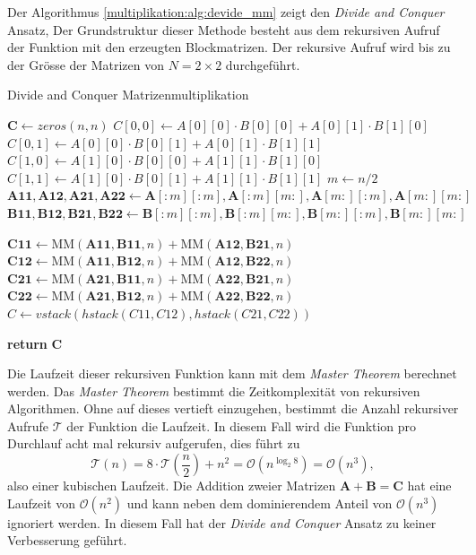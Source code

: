 Der Algorithmus \ref{multiplikation:alg:devide_mm} zeigt den \textit{Divide and Conquer} Ansatz,
Der Grundstruktur dieser Methode besteht aus dem rekursiven Aufruf der Funktion mit den erzeugten Blockmatrizen.
Der rekursive Aufruf wird bis zu der Gr\"osse der Matrizen von $N = 2 \times 2$ durchgef\"uhrt.
\begin{algorithm}\footnotesize\caption{Divide and Conquer Matrizenmultiplikation}
	\setlength{\lineskip}{7pt}
	\label{multiplikation:alg:devide_mm}
	\begin{algorithmic}
		\State  $ \mathbf{C} \gets zeros(n, n)$
		\State  $C[0, 0] \gets  A[0][0]\cdot B[0][0]+A[0][1]\cdot B[1][0]$
		\State  $C[0, 1] \gets  A[0][0]\cdot B[0][1]+A[0][1]\cdot B[1][1]$
		\State  $C[1, 0] \gets  A[1][0]\cdot B[0][0]+A[1][1]\cdot B[1][0]$
		\State  $C[1, 1] \gets  A[1][0]\cdot B[0][1]+A[1][1]\cdot B[1][1]$
		\Else
		\State  $ m \gets n/2$
		\State $\mathbf{A11}, \mathbf{A12}, \mathbf{A21}, \mathbf{A22} \gets \mathbf{A}[:m][:m], \mathbf{A}[:m][m:], \mathbf{A}[m:][:m], \mathbf{A}[m:][m:]$
		\State $\mathbf{B11}, \mathbf{B12}, \mathbf{B21}, \mathbf{B22} \gets \mathbf{B}[:m][:m], \mathbf{B}[:m][m:], \mathbf{B}[m:][:m], \mathbf{B}[m:][m:]$

		\State $\mathbf{C11} \gets \text{MM}(\mathbf{A11}, \mathbf{B11},n) + \text{MM}(\mathbf{A12}, \mathbf{B21},n)$
		\State $\mathbf{C12} \gets \text{MM}(\mathbf{A11},\mathbf{B12},n) + \text{MM}(\mathbf{A12}, \mathbf{B22},n)$
		\State $\mathbf{C21} \gets \text{MM}(\mathbf{A21}, \mathbf{B11},n) + \text{MM}(\mathbf{A22}, \mathbf{B21},n)$
		\State $\mathbf{C22} \gets \text{MM}(\mathbf{A21}, \mathbf{B12},n) + \text{MM}(\mathbf{A22}, \mathbf{B22},n)$
		\State $  C \gets vstack(hstack(C11, C12), hstack(C21, C22))$

		\EndIf
		\State \textbf{return} $\textbf{C}$

		\EndFunction
	\end{algorithmic}
\end{algorithm}

Die Laufzeit dieser rekursiven Funktion kann mit dem \textit{Master Theorem} \cite{multiplikation:master_theorem} berechnet werden. Das \textit{Master Theorem} bestimmt die Zeitkomplexit\"at von rekursiven Algorithmen.
Ohne auf dieses vertieft einzugehen, bestimmt die Anzahl rekursiver Aufrufe $\mathcal{T} $ der Funktion die Laufzeit.
In diesem Fall wird die Funktion pro Durchlauf acht mal rekursiv aufgerufen, dies f\"uhrt zu
\begin{equation} \label{multiplikation:eq:laufzeitdac}
	\mathcal{T}(n) =	8 \cdot \mathcal{T} \left(\frac{n}{2}\right ) + n^2  = \mathcal{O}(n^{\log_2 8}) = \mathcal{O}  (n^{3} ),
\end{equation}
also einer kubischen Laufzeit.
Die Addition zweier Matrizen $\mathbf{A} + \mathbf{B} = \mathbf{C}$ hat eine Laufzeit von $\mathcal{O}(n^{2})$ und kann neben dem dominierendem Anteil von $\mathcal{O}(n^{3})$ ignoriert werden.
In diesem Fall hat der \textit{Divide and Conquer} Ansatz zu keiner Verbesserung gef\"uhrt.


